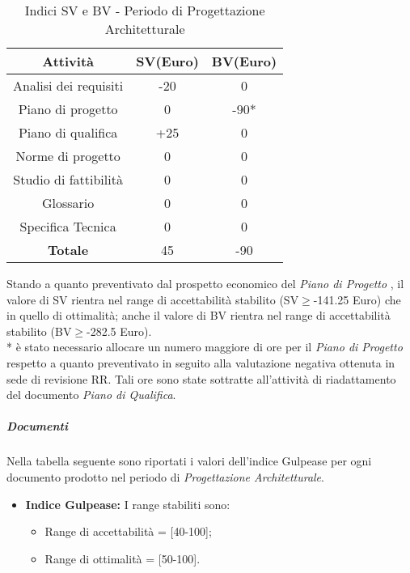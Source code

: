        
      \begin{table}[H]
        \centering
        \begin{tabular}{|c|c|c|}
          \hline
          \textbf{Attività} & \textbf{SV}(Euro)  & \textbf{BV}(Euro) \\
          \hline
          Analisi dei requisiti  & -20 & 0  \\
          Piano di progetto & 0  & -90*\\
          Piano di qualifica  & +25  & 0\\
          Norme di progetto & 0  & 0 \\
          Studio di fattibilità & 0  & 0  \\
          Glossario & 0  & 0  \\
          Specifica Tecnica & 0 & 0\\
          \hline
          \textbf{Totale} & 45  & -90  \\
          \hline
        \end{tabular}
        \caption{Indici SV e BV - Periodo di Progettazione Architetturale}
      \end{table}
      Stando a quanto preventivato dal prospetto economico del \emph{Piano di Progetto \VersionePP{}}, il valore di SV rientra nel range di accettabilità stabilito (SV\(\geq\)-141.25 Euro) che in quello di ottimalità;
      anche il valore di BV rientra nel range di accettabilità stabilito (BV\(\geq\)-282.5 Euro).\\
      * è stato necessario allocare un numero maggiore di ore per il \emph{Piano di Progetto} respetto a quanto preventivato in seguito alla valutazione negativa ottenuta in sede di revisione RR. Tali ore sono state sottratte all'attività di riadattamento del documento \emph{Piano di Qualifica}\VersionePQ{}.
      
      \subparagraph{Documenti}
      Nella tabella seguente sono riportati i valori dell'indice Gulpease per ogni documento prodotto nel periodo di \textit{Progettazione Architetturale}.\\

\begin{itemize}
\item \textbf{Indice Gulpease: }I range stabiliti sono:
      \begin{itemize}
        \item Range di accettabilità = [40-100];
        \item Range di ottimalità = [50-100].
      \end{itemize}
\end{itemize}      
      
